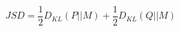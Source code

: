 \begin{equation}
    JSD = \frac{1}{2} D_{KL}(P || M) + \frac{1}{2} D_{KL}(Q || M)
    \label{eq:jsd}
\end{equation}